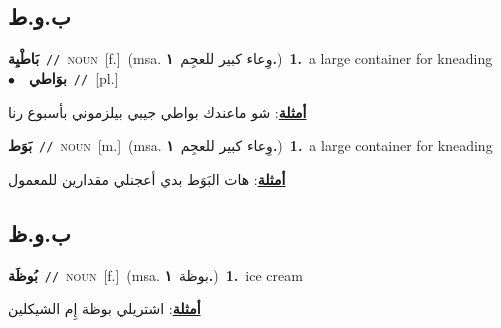 \documentclass[10pt,a4paper,twoside]{article} %
\begin{document}
\begin{multicols}{2}
\vspace{-3mm}
\subsection*{\color{blue}\foreignlanguage{arabic}{ب.و.ط}\color{blue}{}} 

{\setlength\topsep{0pt}\textbf{\foreignlanguage{arabic}{بَاطْيِة}}\ {\color{gray}\texttt{//}\color{black}}\ \textsc{noun}\ [f.]\ \color{gray}(msa. \foreignlanguage{arabic}{وِعاء كبير للعجِم}~\foreignlanguage{arabic}{\textbf{١.}})\color{black}\ \textbf{1.}~a large container for kneading\ \ $\bullet$\ \ \setlength\topsep{0pt}\textbf{\foreignlanguage{arabic}{بوَاطي}}\ {\color{gray}\texttt{//}\color{black}}\ [pl.]\  \begin{flushright}\color{gray}\foreignlanguage{arabic}{\textbf{\underline{\foreignlanguage{arabic}{أمثلة}}}: شو ماعندك بواطي جيبي بيلزموني بأسبوع رنا}\end{flushright}\color{black}} \vspace{2mm}

{\setlength\topsep{0pt}\textbf{\foreignlanguage{arabic}{بَوَط}}\ {\color{gray}\texttt{//}\color{black}}\ \textsc{noun}\ [m.]\ \color{gray}(msa. \foreignlanguage{arabic}{وِعاء كبير للعجِم}~\foreignlanguage{arabic}{\textbf{١.}})\color{black}\ \textbf{1.}~a large container for kneading\  \begin{flushright}\color{gray}\foreignlanguage{arabic}{\textbf{\underline{\foreignlanguage{arabic}{أمثلة}}}: هات البَوَط بدي أعجنلي مقدارين للمعمول}\end{flushright}\color{black}} \vspace{2mm}

\vspace{-3mm}
\subsection*{\color{blue}\foreignlanguage{arabic}{ب.و.ظ}\color{blue}{ (ntws)}} 

{\setlength\topsep{0pt}\textbf{\foreignlanguage{arabic}{بُوظَة}}\ {\color{gray}\texttt{//}\color{black}}\ \textsc{noun}\ [f.]\ \color{gray}(msa. \foreignlanguage{arabic}{بوظة}~\foreignlanguage{arabic}{\textbf{١.}})\color{black}\ \textbf{1.}~ice cream\  \begin{flushright}\color{gray}\foreignlanguage{arabic}{\textbf{\underline{\foreignlanguage{arabic}{أمثلة}}}: اشتريلي بوظة إِم الشيكلين}\end{flushright}\color{black}} \vspace{2mm}


\end{multicols}
\end{document}
